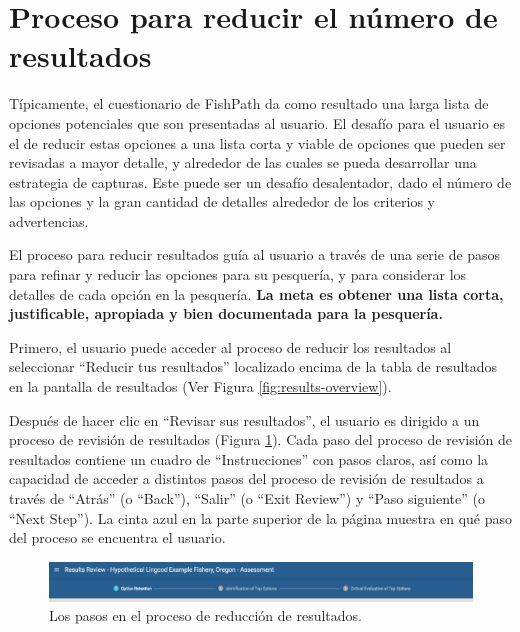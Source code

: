 \documentclass[
  11pt,
]{book}
\begin{document}
\hypertarget{Results-Narrowing}{%
\section{Proceso para reducir el número de resultados}\label{Results-Narrowing}}

Típicamente, el cuestionario de FishPath da como resultado una larga lista de opciones potenciales que son presentadas al usuario. El desafío para el usuario es el de reducir estas opciones a una lista corta y viable de opciones que pueden ser revisadas a mayor detalle, y alrededor de las cuales se pueda desarrollar una estrategia de capturas. Este puede ser un desafío desalentador, dado el número de las opciones y la gran cantidad de detalles alrededor de los criterios y advertencias.

El proceso para reducir resultados guía al usuario a través de una serie de pasos para refinar y reducir las opciones para su pesquería, y para considerar los detalles de cada opción en la pesquería. \textbf{La meta es obtener una lista corta, justificable, apropiada y bien documentada para la pesquería.}

Primero, el usuario puede acceder al proceso de reducir los resultados al seleccionar ``Reducir tus resultados'' localizado encima de la tabla de resultados en la pantalla de resultados (Ver Figura \ref{fig:results-overview}).

Después de hacer clic en ``Revisar sus resultados'', el usuario es dirigido a un proceso de revisión de resultados (Figura \ref{fig:results-review-header}). Cada paso del proceso de revisión de resultados contiene un cuadro de ``Instrucciones'' con pasos claros, así como la capacidad de acceder a distintos pasos del proceso de revisión de resultados a través de ``Atrás'' (o ``Back''), ``Salir'' (o ``Exit Review'') y ``Paso siguiente'' (o ``Next Step''). La cinta azul en la parte superior de la página muestra en qué paso del proceso se encuentra el usuario.

\begin{figure}

{\centering \includegraphics[width=0.95\linewidth]{images/results-review-header} 

}

\caption{Los pasos en el proceso de reducción de resultados.}\label{fig:results-review-header}
\end{figure}
\end{document}
